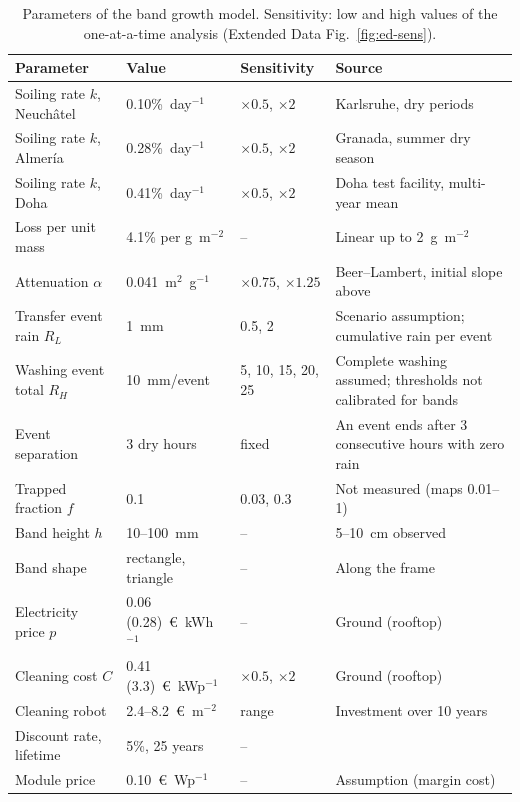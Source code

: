 \begin{table}[!t]
\caption{Parameters of the band growth model. Sensitivity: low and high values of the one-at-a-time analysis (Extended Data Fig.~\ref{fig:ed-sens}).\label{tab:bandparams}}
\begin{tabularx}{\textwidth}{p{3.6cm}p{3.0cm}p{2.3cm}X}
\toprule
\textbf{Parameter} & \textbf{Value} & \textbf{Sensitivity} & \textbf{Source} \\
\midrule
\rowcolor{tabgrey} Soiling rate $k$, Neuch\^atel & 0.10\%~day$^{-1}$ & $\times 0.5$, $\times 2$ & Karlsruhe, dry periods \cite{WorldEnergyMeteorology} \\
Soiling rate $k$, Almer\'ia & 0.28\%~day$^{-1}$ & $\times 0.5$, $\times 2$ & Granada, summer dry season \cite{micheliEconomicsSeasonalPhotovoltaic2021} \\
\rowcolor{tabgrey} Soiling rate $k$, Doha & 0.41\%~day$^{-1}$ & $\times 0.5$, $\times 2$ & Doha test facility, multi-year mean \cite{ahziInvestigationPVSoiling} \\
Loss per unit mass & 4.1\% per g~m$^{-2}$ & -- & Linear up to 2~g~m$^{-2}$ \cite{boyleNaturalSoilingPhotovoltaic2015} \\
\rowcolor{tabgrey} Attenuation $\alpha$ & 0.041~m$^{2}$~g$^{-1}$ & $\times 0.75$, $\times 1.25$ & Beer--Lambert, initial slope above \\
Transfer event rain $R_L$ & 1~mm & 0.5, 2 & Scenario assumption; cumulative rain per event \\
\rowcolor{tabgrey} Washing event total $R_H$ & 10~mm/event & 5, 10, 15, 20, 25 & Complete washing assumed; thresholds not calibrated for bands \\
Event separation & 3 dry hours & fixed & An event ends after 3 consecutive hours with zero rain \\
\rowcolor{tabgrey} Trapped fraction $f$ & 0.1 & 0.03, 0.3 & Not measured (maps 0.01--1) \\
Band height $h$ & 10--100~mm & -- & 5--10~cm observed \cite{yanYao2018} \\
\rowcolor{tabgrey} Band shape & rectangle, triangle & -- & Along the frame \cite{cuiCharacterizationSoilingBands2021a} \\
Electricity price $p$ & 0.06 (0.28)~\euro~kWh$^{-1}$ & -- & Ground (rooftop) \cite{ilseTechnoEconomicAssessmentSoiling2019a} \\
\rowcolor{tabgrey} Cleaning cost $C$ & 0.41 (3.3)~\euro~kWp$^{-1}$ & $\times 0.5$, $\times 2$ & Ground (rooftop) \cite{ilseTechnoEconomicAssessmentSoiling2019a} \\
Cleaning robot & 2.4--8.2~\euro~m$^{-2}$ & range & Investment over 10 years \cite{ilseTechnoEconomicAssessmentSoiling2019a} \\
\rowcolor{tabgrey} Discount rate, lifetime & 5\%, 25 years & -- & \cite{ilseTechnoEconomicAssessmentSoiling2019a} \\
Module price & 0.10~\euro~Wp$^{-1}$ & -- & Assumption (margin cost) \\
\bottomrule
\end{tabularx}
\end{table}

